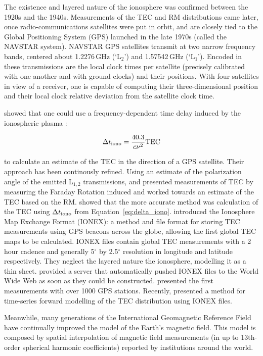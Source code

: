 The existence and layered nature of the ionosphere was confirmed between the 1920s and the 1940s. Measurements of the TEC and RM distributions came later, once radio-communications satellites were put in orbit, and are closely tied to the Global Positioning System (GPS) launched in the late 1970s (called the NAVSTAR system). NAVSTAR GPS satellites transmit at two narrow frequency bands, centered about 1.2276\,GHz (`L$_2$') and 1.57542\,GHz (`L$_1$'). Encoded in these transmissions are the local clock times per satellite (precisely calibrated with one another and with ground clocks) and their positions. With four satellites in view of a receiver, one is capable of computing their three-dimensional position and their local clock relative deviation from the satellite clock time. 

\cite{Macdoran.89} showed that one could use a frequency-dependent time delay induced by the ionospheric plasma \citep{Klobuchar.83, Brunner.93}:

\begin{equation}
\Delta t_{\rm iono} = \frac{40.3}{c\nu^2}{\rm TEC}
\label{eq:delta_iono}
\end{equation}

to calculate an estimate of the TEC in the direction of a GPS satellite. Their approach has been continously refined. 
Using an estimate of the polarization angle of the emitted L$_{1,2}$ transmissions, \cite{Titheridge.72} and \cite{Royden.84} presented measurements of TEC by measuring the Faraday Rotation induced and worked towards an estimate of the TEC based on the RM.
\cite{Lanyi.88} showed that the more accurate method was calculation of the TEC using $\Delta t_{\rm iono}$ from Equation~\ref{eq:delta_iono}.
\cite{Mannucci.98} introduced the Ionosphere Map Exchange Format (IONEX): a method and file format for storing TEC measurements using GPS beacons across the globe, allowing the first global TEC maps to be calculated. IONEX files contain global TEC measurements with a 2 hour cadence and generally 5$^\circ$ by 2.5$^\circ$ resolution in longitude and latitude respectively. They neglect the layered nature the ionosphere, modelling it as a thin sheet.
\cite{Iijima.99} provided a server that automatically pushed IONEX files to the World Wide Web as soon as they could be constructed.
\cite{Komjathy.05} presented the first measurements with over 1000 GPS stations.
Recently, \cite{Erdogan.16} presented a method for time-series forward modelling of the TEC distribution using IONEX files.

Meanwhile, many generations of the International Geomagnetic Reference Field \citep[IGRF][]{Finlay.10} have continually improved the model of the Earth's magnetic field. This model is composed by spatial interpolation of magnetic field measurements (in up to 13th-order spherical harmonic coefficients) reported by institutions around the world.

